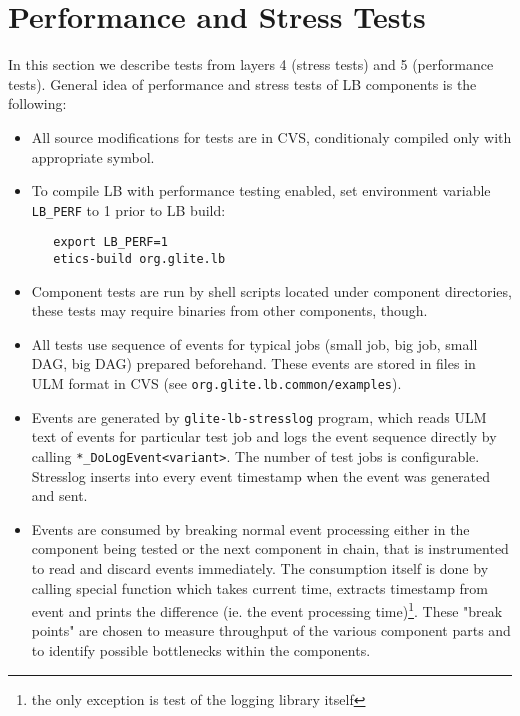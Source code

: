 \section{Performance and Stress Tests}

In this section we describe tests from layers 4 (stress tests) and 5 (performance tests). 
General idea of performance and stress tests of LB components is the following:

\begin{itemize}

\item All source modifications for tests are in CVS, conditionaly compiled only
with appropriate symbol.

\item To compile LB with performance testing enabled, set environment variable
\verb'LB_PERF' to 1 prior to LB build:
\begin{verbatim}
   export LB_PERF=1
   etics-build org.glite.lb
\end{verbatim}

\item Component tests are run by shell scripts located under component
directories, these tests may require binaries from other components, though.

\item All tests use sequence of events for typical jobs (small job, big job,
small DAG, big DAG) prepared beforehand. These events are stored in files in
ULM format in CVS (see \texttt{org.glite.lb.common/examples}).

\item Events are generated by \verb'glite-lb-stresslog' program, which reads
ULM text of events for particular test job and logs the event sequence directly
by calling \verb'*_DoLogEvent<variant>'. The number of test jobs is
configurable. Stresslog inserts into every event timestamp when the event was
generated and sent.

\item Events are consumed by breaking normal event processing either in the
component being tested or the next component in chain, that is instrumented to
read and discard events immediately. The consumption itself is done by calling
special function which takes current time, extracts timestamp from event and
prints the difference (ie. the event processing time)\footnote{the only
exception is test of the logging library itself}. These "break points" are
chosen to measure throughput of the various component parts and to identify
possible bottlenecks within the components.


\end{itemize}

